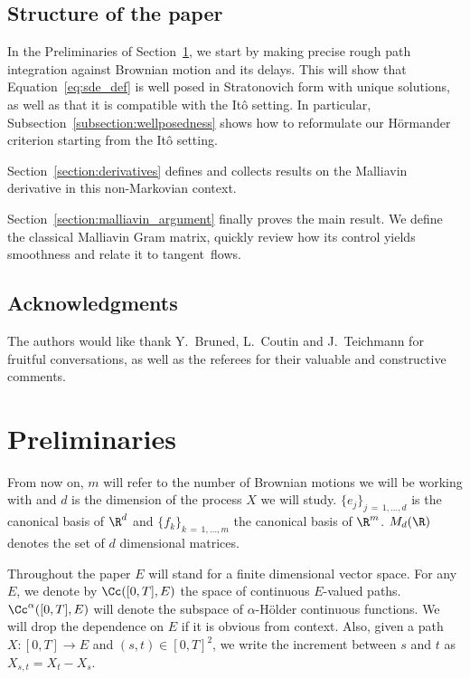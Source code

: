 \subsection{Structure of the paper}
In the Preliminaries of Section~\ref{section:preliminaries}, we start by making precise rough path integration against Brownian motion and its delays. This will show that Equation~\eqref{eq:sde_def} is well posed in Stratonovich form with unique solutions, as well as that it is compatible with the Itô setting. In particular, Subsection~\ref{subsection:wellposedness} shows how to reformulate our H\"ormander criterion starting from the Itô setting.

Section~\ref{section:derivatives} defines and collects results on the Malliavin derivative in this non-Markovian context.

Section~\ref{section:malliavin_argument} finally proves the main result. We define the classical Malliavin Gram matrix, quickly review how its control yields smoothness and relate it to tangent~flows.

\subsection*{Acknowledgments}
The authors would like thank Y.~Bruned, L.~Coutin and J.~Teichmann for fruitful conversations, as well as the referees for their valuable and constructive comments.

\section{Preliminaries}\label{section:preliminaries}

From now on, $m$ will refer to the number of Brownian motions we will be working with and $d$ is the dimension of the process $X$ we will study. $\{e_j\}_{j\,=\,1,\dots,d}$ is the canonical basis of $\R^d$ and $\{f_k\}_{k\,=\,1,\dots,m}$ the canonical basis of $\R^m$. $M_d(\R)$ denotes the set of $d$ dimensional matrices.

Throughout the paper $E$ will stand for a finite dimensional vector space. For any $E$, we denote by $\Cc([0,T],E)$ the space of continuous $E$-valued paths. $\Cc^\alpha([0,T],E)$ will denote the subspace of $\alpha$-H\"older continuous functions. We will drop the dependence on $E$ if it is obvious from context. Also, given a path $X:[0,T] \rightarrow E$ and $(s,t) \in [0,T]^2$, we write the increment between $s$ and $t$ as $X_{s,t} = X_t - X_s$.

